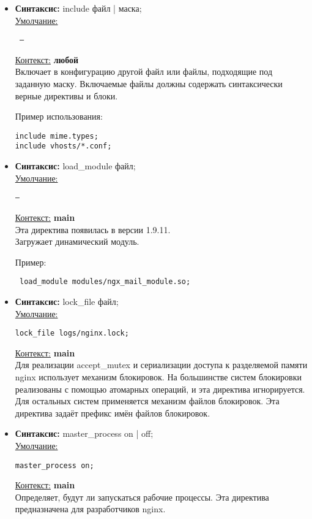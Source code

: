 \documentclass[a4paper,10pt,twoside]{article}
\begin{document}
\begin{itemize}
\item \textbf{Синтаксис:} include файл | маска;\\
\underline{Умолчание:}
\begin{verbatim}
 —
\end{verbatim} 
\underline{Контекст:} \textbf{любой}\\
Включает в конфигурацию другой файл или файлы, подходящие под заданную маску. Включаемые файлы должны содержать синтаксически верные директивы и блоки.

Пример использования:

\begin{verbatim}
include mime.types;
include vhosts/*.conf;
\end{verbatim} 

\item \textbf{Синтаксис:} load\_module файл;\\
\underline{Умолчание:}
\begin{verbatim}
—
\end{verbatim} 
\underline{Контекст:} \textbf{main}\\
Эта директива появилась в версии 1.9.11.\\
Загружает динамический модуль.

Пример:
\begin{verbatim}
 load_module modules/ngx_mail_module.so;
\end{verbatim} 
\item \textbf{Синтаксис:} lock\_file файл;\\
\underline{Умолчание:}
\begin{verbatim}
lock_file logs/nginx.lock;\end{verbatim} 
\underline{Контекст:} \textbf{main}\\
Для реализации accept\_mutex и сериализации доступа к разделяемой памяти nginx использует механизм блокировок. На большинстве систем блокировки реализованы с помощью атомарных операций, и эта директива игнорируется. Для остальных систем применяется механизм файлов блокировок. Эта директива задаёт префикс имён файлов блокировок.

\item \textbf{Синтаксис:} master\_process on | off;\\
\underline{Умолчание:}
\begin{verbatim}
master_process on;
\end{verbatim} 
\underline{Контекст:} \textbf{main}\\
Определяет, будут ли запускаться рабочие процессы. Эта директива предназначена для разработчиков nginx.


\end{itemize}
\end{document}
